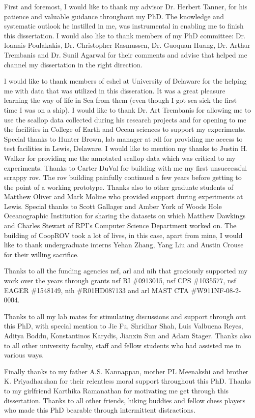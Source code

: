 First and foremost, I would like to thank my advisor Dr. Herbert Tanner, for his patience and valuable guidance throughout my PhD. The knowledge and systematic outlook he instilled in me, was instrumental in enabling me to finish this dissertation. I would also like to thank members of my PhD committee: Dr. Ioannis Poulakakis, 
Dr. Christopher Rasmussen, Dr. Guoquan Huang, Dr. Arthur Trembanis and Dr. Sunil Agarwal for their comments and advise that helped me channel my dissertation in the right direction.

I would like to thank members of \gls{cshel} at University of Delaware for the helping me with data that was utilized in this disseration. It was a great pleasure learning the way of life in Sea from them (even though I got sea sick the first time I was on a ship). I would like to thank Dr. Art Trembanis for allowing me to use the scallop data collected during his research projects and for opening to me the facilities in College of Earth and Ocean sciences to support my experiments. Special thanks to Hunter Brown, lab manager at \gls{rdl} for providing me access to test facilities in Lewis, Delaware. I would like to mention my thanks to Justin H. Walker for providing me the annotated scallop data which was critical to my experiments. Thanks to Carter DuVal for building with me my first unsuccessful scrappy \gls{rov}. The \gls{rov} building painfully continued a few years before getting to the point of a working prototype. Thanks also to other graduate students of Matthew Oliver and Mark Moline who provided support during experiments at Lewis. Special thanks to Scott Gallager and Amber York of Woods Hole Oceanographic Institution for sharing the datasets on which Matthew Dawkings and Charles Stewart of RPI’s Computer Science Department worked on. The building of CoopROV took a lot of lives, in this case, apart from mine, I would like to thank undergraduate interns Yehan Zhang, Yang Liu and Austin Crouse for their willing sacrifice.

Thanks to all the funding agencies \gls{nsf}, \gls{arl} and \gls{nih} that graciously supported my work over the years through grants \gls{nsf} RI \#0913015, \gls{nsf} CPS \#1035577, \gls{nsf} EAGER \#1548149, \gls{nih} \#R01HD087133 and \gls{arl} MAST CTA \#W911NF-08-2-0004.

Thanks to all my lab mates for stimulating discussions and support through out this PhD, with special mention to Jie Fu, Shridhar Shah, Luis Valbuena Reyes, Aditya Boddu, Konstantinos Karydis, Jianxin Sun and Adam Stager. Thanks also to all other university faculty, staff and fellow students who had assisted me in various ways.

Finally thanks to my father A.S. Kannappan, mother PL Meenakshi and brother K. Priyadharshan for their relentless moral support throughout this PhD. Thanks to my girlfriend Karthika Ramanathan for motivating me get through this dissertation. Thanks to all other friends, hiking buddies and fellow chess players who made this PhD bearable through intermittent distractions.